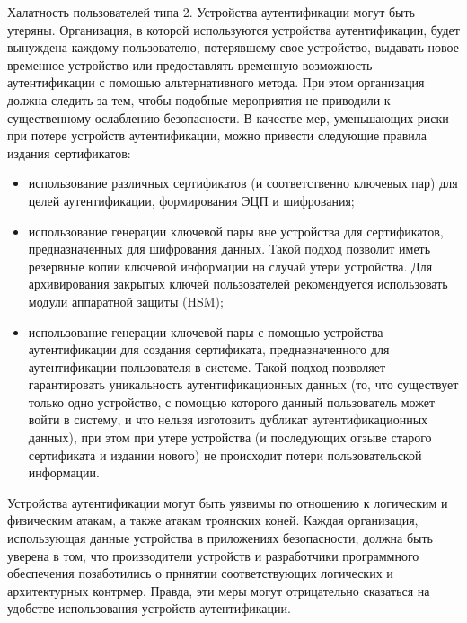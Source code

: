 Халатность пользователей типа 2. Устройства аутентификации могут быть утеряны.
Организация, в которой используются устройства аутентификации, будет вынуждена
каждому пользователю, потерявшему свое устройство, выдавать новое временное
устройство или предоставлять временную возможность аутентификации с помощью
альтернативного метода. При этом организация должна следить за тем, чтобы
подобные мероприятия не приводили к существенному ослаблению безопасности. В
качестве мер, уменьшающих риски при потере устройств аутентификации, можно
привести следующие правила издания сертификатов:
\begin{itemize}
  \item использование различных сертификатов (и соответственно ключевых пар) для целей
аутентификации, формирования ЭЦП и шифрования;
  \item использование генерации
ключевой пары вне устройства для сертификатов, предназначенных для шифрования
данных. Такой подход позволит иметь резервные копии ключевой информации на
случай утери устройства. Для архивирования закрытых ключей пользователей
рекомендуется использовать модули аппаратной защиты (HSM);
  \item использование
генерации ключевой пары с помощью устройства аутентификации для создания
сертификата, предназначенного для аутентификации пользователя в системе. Такой
подход позволяет гарантировать уникальность аутентификационных данных (то, что
существует только одно устройство, с помощью которого данный пользователь может
войти в систему, и что нельзя изготовить дубликат аутентификационных данных),
при этом при утере устройства (и последующих отзыве старого
сертификата и издании нового) не происходит потери пользовательской информации.
\end{itemize}

Устройства аутентификации могут быть уязвимы по отношению к логическим и
физическим атакам, а также атакам троянских коней. Каждая организация,
использующая данные устройства в приложениях безопасности, должна быть уверена в
том, что производители устройств и разработчики программного обеспечения
позаботились о принятии соответствующих логических и архитектурных контрмер.
Правда, эти меры могут отрицательно сказаться на удобстве использования
устройств аутентификации.

